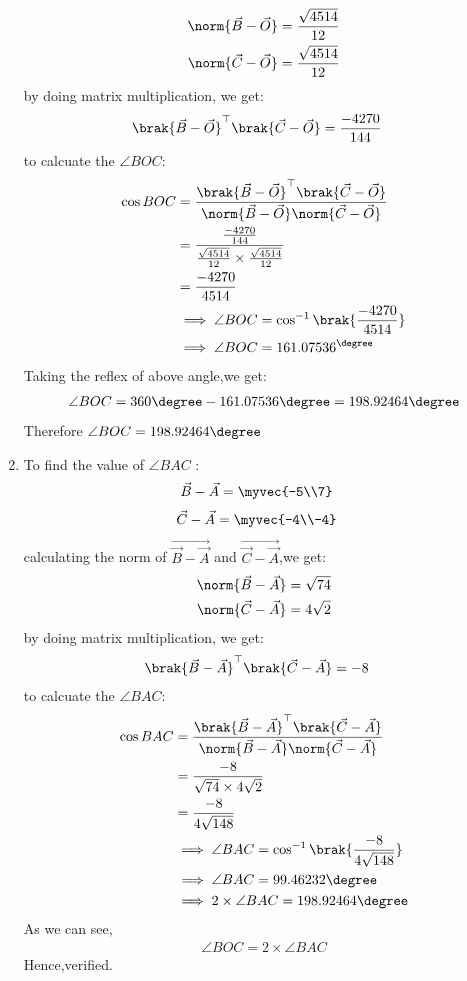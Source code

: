 \documentclass[journal,12pt,twocolumn]{IEEEtran}
\theoremstyle{remark}
\begin{document}
\begin{enumerate}
\begin{align}
	\norm{\Vec{B}-\Vec{O}}&= \frac{\sqrt{4514}}{12}\\
	\norm{\Vec{C}-\Vec{O}}&= \frac{\sqrt{4514}}{12}
\end{align}
by doing matrix multiplication, we get:
\begin{align}
\brak{\Vec{B}-\Vec{O}}^{\top}\brak{\Vec{C}-\Vec{O}}&=\frac{-4270}{144}
\end{align}
to calcuate the $\angle{BOC}$:
\begin{align}
\cos{BOC}&=\frac{\brak{\Vec{B}-\Vec{O}}^{\top}\brak{\Vec{C}-\Vec{O}}}{\norm{\Vec{B}-\Vec{O}}\norm{\Vec{C}-\Vec{O}}}\\
&=\frac{\frac{-4270}{144}}{\frac{\sqrt{4514}}{12}\times\frac{\sqrt{4514}}{12}}\\
&=\frac{-4270}{4514}\\
&\implies\angle{BOC}=\cos^{-1}\brak{\frac{-4270}{4514}}\\
&\implies\angle{BOC}=161.07536^{\degree}
\end{align}
Taking the reflex of above angle,we get:
\begin{align}
\angle{BOC}=360\degree-161.07536\degree=198.92464\degree
\end{align}
Therefore $\angle{BOC}=198.92464\degree$






	\item To find  the value of $\angle{BAC}$ :
\begin{align}
\Vec{B}-\Vec{A}
         & =\myvec{-5\\7}
\end{align}
\begin{align}
\Vec{C}-\Vec{A}
          &=\myvec{-4\\-4}
\end{align}
calculating the norm of $\Vec{\Vec{B}-\Vec{A}}$ and $\Vec{\Vec{C}-\Vec{A}}$,we get:
\begin{align}
	\norm{\Vec{B}-\Vec{A}}&= \sqrt{74}\\
	\norm{\Vec{C}-\Vec{A}}&= 4\sqrt{2}
\end{align}
by doing matrix multiplication, we get:
\begin{align}
\brak{\Vec{B}-\Vec{A}}^{\top}\brak{\Vec{C}-\Vec{A}}&=-8
\end{align}
to calcuate the $\angle{BAC}$:
\begin{align}
	\cos{BAC}&=\frac{\brak{\Vec{B}-\Vec{A}}^{\top}\brak{\Vec{C}-\Vec{A}}}{\norm{\Vec{B}-\Vec{A}}\norm{\Vec{C}-\Vec{A}}}\\
&=\frac{-8}{\sqrt{74}\times4\sqrt{2}}\\
&=\frac{-8}{4\sqrt{148}}\\
&\implies\angle{BAC}=\cos^{-1}\brak{\frac{-8}{4\sqrt{148}}}\\
&\implies\angle{BAC}=99.46232\degree\\
&\implies 2\times\angle{BAC}=198.92464\degree 
\end{align}
As we can see,
\begin{align}
\angle{BOC}=2\times\angle{BAC}
\end{align}
Hence,verified.

\end{enumerate}
\end{document}
